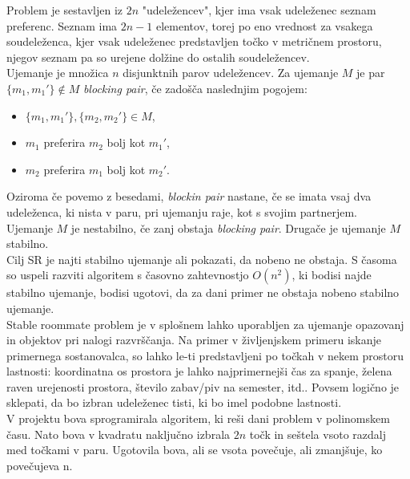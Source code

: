 \documentclass[12pt, a4paper]{article}
\begin{document}
 Problem je sestavljen iz $2n$ "udeležencev", kjer ima vsak udeleženec seznam preferenc. Seznam ima $2n - 1$ elementov, torej po eno vrednost za vsakega soudeleženca, kjer vsak udeleženec predstavljen točko v metričnem prostoru, njegov seznam pa so urejene dolžine do ostalih soudeležencev.\\
Ujemanje je množica $n$ disjunktnih parov udeležencev.
Za ujemanje $M$ je par $\{m_{1}, m_{1}' \} \notin M$ \textit{blocking pair}, če zadošča naslednjim pogojem:
\begin{itemize}
	\item  $\{m_{1}, m_{1}' \}, \{m_{2}, m_{2}' \} \in M$,
	\item $m_1$ preferira $m_2$ bolj kot $m_1'$,
	\item $m_2$ preferira $m_1$ bolj kot $m_2'$.
\end{itemize}
Oziroma če povemo z besedami, \textit{blockin pair} nastane, če se imata vsaj dva udeleženca, ki nista v paru, pri ujemanju raje, kot s svojim partnerjem. \\

Ujemanje $M$ je nestabilno, če zanj obstaja \textit{blocking pair}. Drugače je ujemanje $M$ stabilno.\\
Cilj SR je najti stabilno ujemanje ali pokazati, da nobeno ne obstaja. S časoma so uspeli razviti algoritem s časovno zahtevnostjo $O(n^2)$, ki bodisi najde stabilno ujemanje, bodisi ugotovi, da za dani primer ne obstaja nobeno stabilno ujemanje.\\

Stable roommate problem je v splošnem lahko uporabljen za ujemanje opazovanj in objektov pri nalogi razvrščanja. Na primer v življenjskem primeru iskanje primernega sostanovalca, so lahko le-ti predstavljeni po točkah v nekem prostoru lastnosti: koordinatna os prostora je lahko najprimernejši čas za spanje, želena raven urejenosti prostora, število zabav/piv na semester, itd.. Povsem logično je sklepati, da bo izbran udeleženec tisti, ki bo imel podobne lastnosti. \\

V projektu bova sprogramirala algoritem, ki reši dani problem v polinomskem času. Nato bova v  kvadratu naključno izbrala $2n$ točk in seštela vsoto razdalj med točkami v paru. Ugotovila bova, ali se vsota povečuje, ali zmanjšuje, ko povečujeva n.
\end{document}
